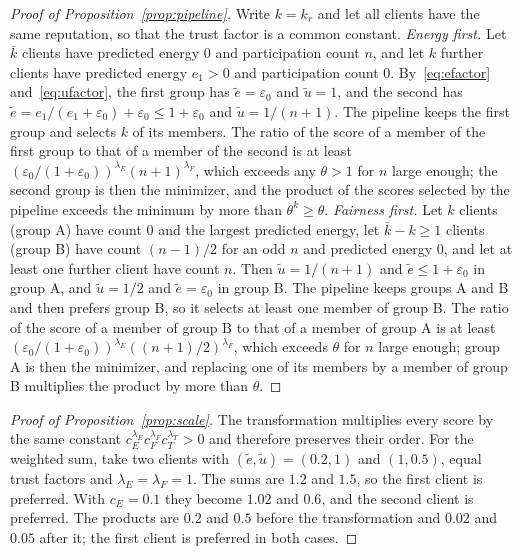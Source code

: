 \begin{proof}[Proof of Proposition~\ref{prop:pipeline}]
	Write $k=k_r$ and let all clients have the same reputation, so that the trust factor is a common constant. \emph{Energy first.} Let $\bar k$ clients have predicted energy $0$ and participation count $n$, and let $k$ further clients have predicted energy $e_1>0$ and participation count $0$. By~\eqref{eq:efactor} and~\eqref{eq:ufactor}, the first group has $\tilde e=\varepsilon_0$ and $\tilde u=1$, and the second has $\tilde e=e_1/(e_1+\varepsilon_0)+\varepsilon_0\le 1+\varepsilon_0$ and $\tilde u=1/(n+1)$. The pipeline keeps the first group and selects $k$ of its members. The ratio of the score of a member of the first group to that of a member of the second is at least $(\varepsilon_0/(1+\varepsilon_0))^{\lambda_E}(n+1)^{\lambda_F}$, which exceeds any $\theta>1$ for $n$ large enough; the second group is then the minimizer, and the product of the scores selected by the pipeline exceeds the minimum by more than $\theta^k\ge \theta$. \emph{Fairness first.} Let $k$ clients (group A) have count $0$ and the largest predicted energy, let $\bar k-k\ge 1$ clients (group B) have count $(n-1)/2$ for an odd $n$ and predicted energy $0$, and let at least one further client have count $n$. Then $\tilde u=1/(n+1)$ and $\tilde e\le 1+\varepsilon_0$ in group A, and $\tilde u=1/2$ and $\tilde e=\varepsilon_0$ in group B. The pipeline keeps groups A and B and then prefers group B, so it selects at least one member of group B. The ratio of the score of a member of group B to that of a member of group A is at least $(\varepsilon_0/(1+\varepsilon_0))^{\lambda_E}((n+1)/2)^{\lambda_F}$, which exceeds $\theta$ for $n$ large enough; group A is then the minimizer, and replacing one of its members by a member of group B multiplies the product by more than $\theta$.
\end{proof}

\begin{proof}[Proof of Proposition~\ref{prop:scale}]
	The transformation multiplies every score by the same constant $c_E^{\lambda_E}c_F^{\lambda_F}c_T^{\lambda_T}>0$ and therefore preserves their order. For the weighted sum, take two clients with $(\tilde e,\tilde u)=(0.2,1)$ and $(1,0.5)$, equal trust factors and $\lambda_E=\lambda_F=1$. The sums are $1.2$ and $1.5$, so the first client is preferred. With $c_E=0.1$ they become $1.02$ and $0.6$, and the second client is preferred. The products are $0.2$ and $0.5$ before the transformation and $0.02$ and $0.05$ after it; the first client is preferred in both cases.
\end{proof}

